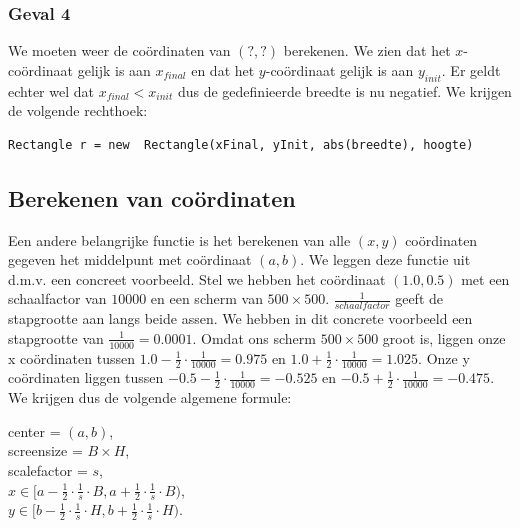 \documentclass[hidelinks, dutch]{article}
\begin{document}
\subsubsection{Geval 4}
\begin{center}
\end{center}
We moeten weer de coördinaten van $(?,?)$ berekenen. We zien dat het $x$-coördinaat gelijk  is aan $x_{final}$ en dat het $y$-coördinaat gelijk is aan $y_{init}$. Er geldt echter wel dat $x_{final}<x_{init}$ dus de gedefinieerde breedte is nu negatief. We krijgen de volgende rechthoek:
\begin{lstlisting}
Rectangle r = new  Rectangle(xFinal, yInit, abs(breedte), hoogte)
\end{lstlisting}

\subsection{Berekenen van coördinaten}
Een andere belangrijke functie is het berekenen van alle $(x,y)$ coördinaten gegeven het middelpunt met coördinaat $(a,b)$. We leggen deze functie uit d.m.v. een concreet voorbeeld. Stel we hebben het coördinaat $(1.0, 0.5)$ met een schaalfactor van $10000$ en een scherm van $500\times 500$. $\frac{1}{schaalfactor}$ geeft de stapgrootte aan langs beide assen. We hebben in dit concrete voorbeeld een stapgrootte van $\frac{1}{10000}=0.0001$. Omdat ons scherm $500\times 500$ groot is, liggen onze x coördinaten tussen $1.0-\frac{1}{2}\cdot\frac{1}{10000}=0.975$ en $1.0+\frac{1}{2}\cdot\frac{1}{10000}=1.025$. Onze y coördinaten liggen tussen $-0.5-\frac{1}{2}\cdot\frac{1}{10000}=-0.525$ en $-0.5+\frac{1}{2}\cdot\frac{1}{10000}=-0.475$. We krijgen dus de volgende algemene formule:
\begin{center}
	center = $(a,b)$, \\
	screensize = $B\times H$, \\
	scalefactor = $s$, \\
	$x \in \big[ a - \frac{1}{2} \cdot \frac{1}{s} \cdot B, a+\frac{1}{2} \cdot \frac{1}{s} \cdot B \big) $, \\
	$y \in \big[  b-\frac{1}{2} \cdot \frac{1}{s} \cdot H, b+\frac{1}{2} \cdot \frac{1}{s} \cdot H \big) $. \\
\end{center}
\end{document}
